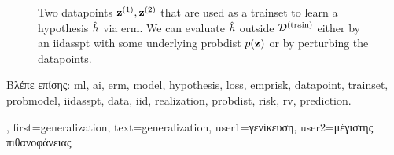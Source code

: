 {{\begin{figure}[H]
		                   	\caption{Two \gls{datapoint}s ${\bf z}^{(1)},{\bf z}^{(2)}$ that are used as a \gls{trainset} 
		                   		to learn a \gls{hypothesis} $\hat{h}$ via \gls{erm}. We can evaluate $\hat{h}$ 
		                   		outside $\mathcal{D}^{(\rm train)}$ either by an \gls{iidasspt} with some underlying \gls{probdist} $p({\bf z})$ 
		                   		or by perturbing the \gls{datapoint}s.}
		                   	\label{fig:polynomial_fit_dict}
		                   \end{figure}
		                   \foreignlanguage{greek}{Βλέπε επίσης:} \gls{ml}, \gls{ai}, \gls{erm}, \gls{model}, \gls{hypothesis}, \gls{loss}, \gls{emprisk}, \gls{datapoint}, \gls{trainset}, \gls{probmodel}, \gls{iidasspt}, \gls{data}, \gls{iid}, \gls{realization}, \gls{probdist}, \gls{risk}, \gls{rv}, \gls{prediction}.
		},
	first={generalization},
	text={generalization},
	user1={\foreignlanguage{greek}{γενίκευση}}, %
  	user2={\foreignlanguage{greek}{μέγιστης πιθανοφάνειας}} %
}


